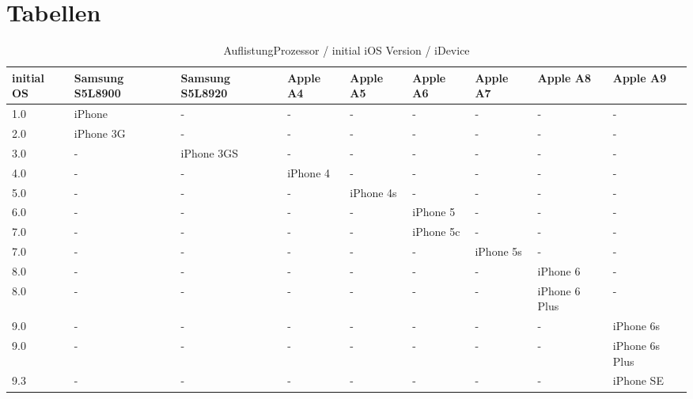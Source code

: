 \newpage
\chapter{Tabellen}
\begin{table}[htp!]
    \begin{center}
        \begin{tabular}{| p{8mm} | p{18mm} | p{18mm} | p{15mm} | p{15mm} | p{15mm} | p{15mm} | p{15mm} | p{15mm} |} \hline
\textbf{initial OS} & \textbf{Samsung S5L8900} & \textbf{Samsung S5L8920} & \textbf{Apple A4}	& \textbf{Apple A5}	& \textbf{Apple A6} & \textbf{Apple A7} & \textbf{Apple A8} & \textbf{Apple A9} \\ \hline
1.0 & iPhone & - & - &  - &  - & - &  - & - \\ \hline		
2.0 & iPhone 3G & - & - &  - &  - & - &  - & - \\ \hline				
3.0 & - & iPhone 3GS & - &  - &  - & - &  - & -	\\ \hline			
4.0 & - &  - & iPhone 4	 &  - &  - & - &  - & -	\\ \hline		
5.0 &  - & - &  - &	iPhone 4s &  - & - &  - & - \\ \hline		
6.0 &  - &  - & - &  - & iPhone 5 & - &  - & -	\\ \hline	
7.0 &  - &  - & - &  - & iPhone 5c	& - &  - & - \\ \hline	
7.0 & - &  - &  - & - &  - & iPhone 5s &  - & - \\ \hline
8.0 & - & - &  - &  - & - &  - & iPhone 6 & - \\ \hline
8.0 & - & - &  - &  - & - &  - & iPhone 6 Plus & -\\ \hline
9.0 & - & - &  - &  - & - &  - & - & iPhone 6s \\ \hline
9.0 & - & - &  - &  - & - &  - & - & iPhone 6s Plus \\ \hline
9.3 & - & - &  - &  - & - &  - & - & iPhone SE \\ \hline     
        \end{tabular} 
        \caption{AuflistungProzessor / initial iOS Version / iDevice \protect\footnotemark}
        \label{tab:AuflistungProziOSVersioniDevice}
    \end{center}
\end{table}
\newpage
